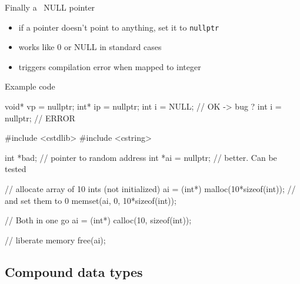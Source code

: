 \begin{frame}[fragile]
  \begin{block}{Finally a \cpp~NULL pointer}
    \begin{itemize}
    \item if a pointer doesn't point to anything, set it to \texttt{nullptr}
    \item works like 0 or NULL in standard cases
    \item triggers compilation error when mapped to integer
    \end{itemize}
  \end{block}
  \pause
  \begin{exampleblock}{Example code}
    \begin{cppcode*}{}
      void* vp = nullptr;
      int* ip = nullptr;
      int i = NULL;      // OK -> bug ?
      int i = nullptr;   // ERROR
    \end{cppcode*}
  \end{exampleblock}
\end{frame}

\begin{frame}[fragile]
  \begin{cppcode}
    #include <cstdlib>
    #include <cstring>

    int *bad;          // pointer to random address
    int *ai = nullptr; // better. Can be tested

    // allocate array of 10 ints (not initialized)
    ai = (int*) malloc(10*sizeof(int));
    // and set them to 0
    memset(ai, 0, 10*sizeof(int));

    // Both in one go
    ai = (int*) calloc(10, sizeof(int));
    
    // liberate memory
    free(ai);
  \end{cppcode}
\end{frame}


\subsection[Compound]{Compound data types}

